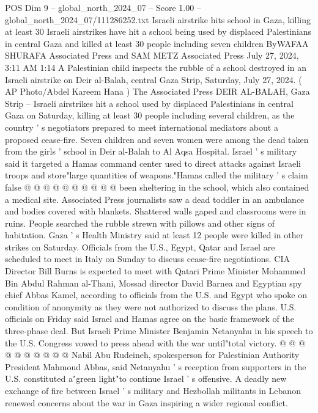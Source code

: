 \begin{textsample}{POS Dim 9 – global\_north\_2024\_07 – Score 1.00 – global\_north\_2024\_07/111286252.txt}  \label{ex:f9_pos_314}
Israeli airstrike hits school in Gaza, killing at least 30 Israeli airstrikes have hit a school being used by displaced Palestinians in central Gaza and killed at least 30 people including seven children ByWAFAA SHURAFA Associated Press and SAM METZ Associated Press July 27, 2024, 3:11 AM 1:14 A Palestinian child inspects the rubble of a school destroyed in an Israeli airstrike on Deir al-Balah, central Gaza Strip, Saturday, July 27, 2024. ( AP Photo/Abdel Kareem Hana ) The Associated Press DEIR AL-BALAH, Gaza Strip -- Israeli airstrikes hit a school used by displaced Palestinians in central Gaza on Saturday, killing at least 30 people including several children, as the country ' s negotiators prepared to meet international mediators about a proposed cease-fire.
Seven children and seven women were among the dead taken from the girls ' school in Deir al-Balah to Al Aqsa Hospital.
Israel ' s military said it targeted a Hamas command center used to direct attacks against Israeli troops and store"large quantities of weapons."Hamas called the military ' s claim false @ @ @ @ @ @ @ @ @ @ been sheltering in the school, which also contained a medical site.
Associated Press journalists saw a dead toddler in an ambulance and bodies covered with blankets.
Shattered walls gaped and classrooms were in ruins.
People searched the rubble strewn with pillows and other signs of habitation.
Gaza ' s Health Ministry said at least 12 people were killed in other strikes on Saturday.
Officials from the U.S., Egypt, Qatar and Israel are scheduled to meet in Italy on Sunday to discuss cease-fire negotiations.
CIA Director Bill Burns is expected to meet with Qatari Prime Minister Mohammed Bin Abdul Rahman al-Thani, Mossad director David Barnea and Egyptian spy chief Abbas Kamel, according to officials from the U.S. and Egypt who spoke on condition of anonymity as they were not authorized to discuss the plans.
U.S. officials on Friday said Israel and Hamas agree on the basic framework of the three-phase deal.
But Israeli Prime Minister Benjamin Netanyahu in his speech to the U.S.
Congress vowed to press ahead with the war until"total victory. @ @ @ @ @ @ @ @ @ @ Nabil Abu Rudeineh, spokesperson for Palestinian Authority President Mahmoud Abbas, said Netanyahu ' s reception from supporters in the U.S. constituted a"green light"to continue Israel ' s offensive.
A deadly new exchange of fire between Israel ' s military and Hezbollah militants in Lebanon renewed concerns about the war in Gaza inspiring a wider regional conflict.

\end{textsample}
